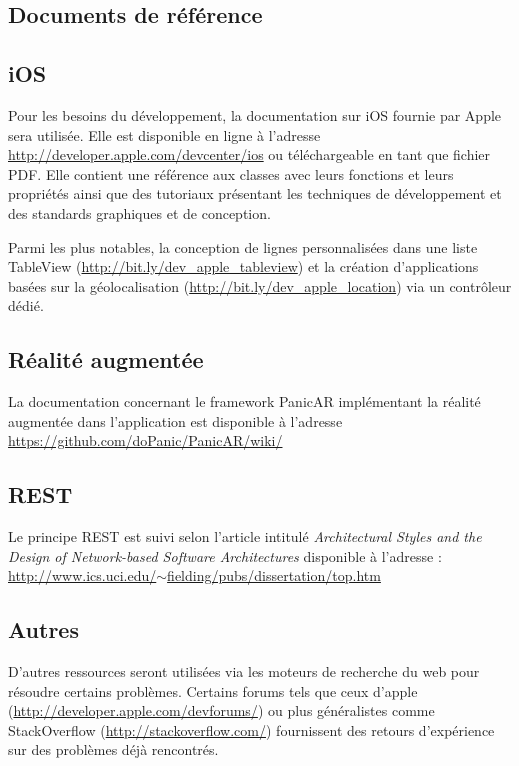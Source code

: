 \documentclass[a4paper,12pt]{report}
\begin{document}
\begin{onehalfspace}
\chapter{Documents de référence}
\section{iOS}
Pour les besoins du développement, la documentation sur iOS fournie par Apple sera utilisée. Elle est disponible en ligne à l'adresse \href{http://developer.apple.com/devcenter/ios/}{http://developer.apple.com/devcenter/ios} ou téléchargeable en tant que fichier PDF.
Elle contient une référence aux classes avec leurs fonctions et leurs propriétés ainsi que des tutoriaux présentant les techniques de développement et des standards graphiques et de conception.

Parmi les plus notables, la conception de lignes personnalisées dans une liste TableView (\href{http://developer.apple.com/library/ios/#documentation/UserExperience/Conceptual/TableView_iPhone/TableViewCells/TableViewCells.html#//apple_ref/doc/uid/TP40007451-CH7-SW1}{http://bit.ly/dev\_apple\_tableview}) et la création d'applications basées sur la géolocalisation (\href{http://developer.apple.com/library/ios/#documentation/UserExperience/Conceptual/LocationAwarenessPG/CoreLocation/CoreLocation.html}{http://bit.ly/dev\_apple\_location}) via un contrôleur dédié.

\section{Réalité augmentée}
La documentation concernant le framework PanicAR implémentant la réalité augmentée dans l'application est disponible à l'adresse \href{https://github.com/doPanic/PanicAR/wiki/}{https://github.com/doPanic/PanicAR/wiki/}

\section{REST}
Le principe REST est suivi selon l'article intitulé \emph{Architectural Styles and the Design of Network-based Software Architectures} disponible à l'adresse :\newline
\href{http://www.ics.uci.edu/~fielding/pubs/dissertation/top.htm}{http://www.ics.uci.edu/$\sim$fielding/pubs/dissertation/top.htm}

\section{Autres}
D'autres ressources seront utilisées via les moteurs de recherche du web pour résoudre certains problèmes. Certains forums tels que ceux d'apple (\href{http://developer.apple.com/devforums/}{http://developer.apple.com/devforums/}) ou plus généralistes comme StackOverflow (\href{http://stackoverflow.com/}{http://stackoverflow.com/}) fournissent des retours d'expérience sur des problèmes déjà rencontrés.


\end{onehalfspace}
\end{document}
